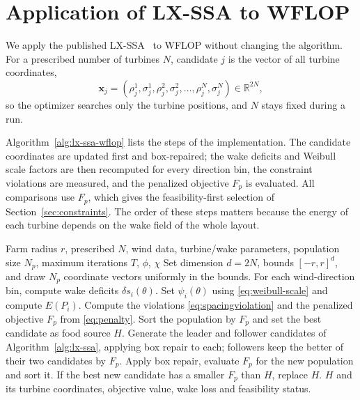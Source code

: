 \documentclass[journal,twoside]{IEEEtran}
\begin{document}
\section{Application of LX-SSA to WFLOP}
\label{sec:lxssa-wflop}

We apply the published LX-SSA~\cite{Solanki2023} to WFLOP without changing the algorithm. For a prescribed number of turbines $N$, candidate $j$ is the vector of all turbine coordinates,
\[
\mathbf{x}_j=(\rho_j^1,\sigma_j^1,\rho_j^2,\sigma_j^2,\ldots,\rho_j^N,\sigma_j^N)\in\mathbb{R}^{2N},
\]
so the optimizer searches only the turbine positions, and $N$ stays fixed during a run.

Algorithm~\ref{alg:lx-ssa-wflop} lists the steps of the implementation. The candidate coordinates are updated first and box-repaired; the wake deficits and Weibull scale factors are then recomputed for every direction bin, the constraint violations are measured, and the penalized objective $F_p$ is evaluated. All comparisons use $F_p$, which gives the feasibility-first selection of Section~\ref{sec:constraints}. The order of these steps matters because the energy of each turbine depends on the wake field of the whole layout.

\begin{algorithm}
\caption{Application of LX-SSA to WFLOP for a prescribed turbine count $N$}
\label{alg:lx-ssa-wflop}
\begin{algorithmic}[1]
\Require Farm radius $r$, prescribed $N$, wind data, turbine/wake parameters, population size $N_p$, maximum iterations $T$, $\phi$, $\chi$
\State Set dimension $d=2N$, bounds $[-r,r]^d$, and draw $N_p$ coordinate vectors uniformly in the bounds.
    \State For each wind-direction bin, compute wake deficits $\delta s_i(\theta)$.
    \State Set $\psi_i(\theta)$ using \eqref{eq:weibull-scale} and compute $E(P_i)$.
    \State Compute the violations \eqref{eq:spacingviolation} and the penalized objective $F_p$ from \eqref{eq:penalty}.
\EndFor
\State Sort the population by $F_p$ and set the best candidate as food source $H$.
    \State Generate the leader and follower candidates of Algorithm~\ref{alg:lx-ssa}, applying box repair to each; followers keep the better of their two candidates by $F_p$.
    \State Apply box repair, evaluate $F_p$ for the new population and sort it.
    \State If the best new candidate has a smaller $F_p$ than $H$, replace $H$.
\EndFor
\State \Return $H$ and its turbine coordinates, objective value, wake loss and feasibility status.
\end{algorithmic}
\end{algorithm}
\end{document}
